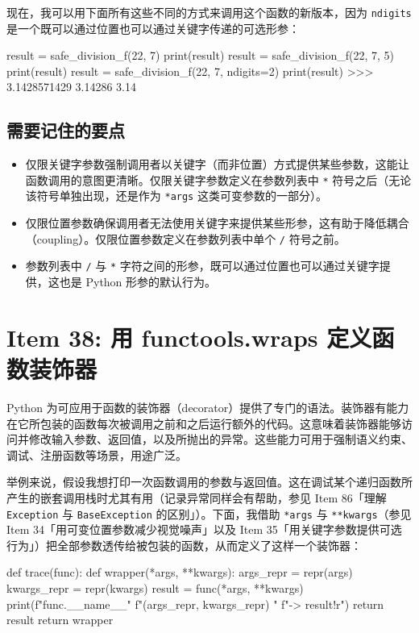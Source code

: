现在，我可以用下面所有这些不同的方式来调用这个函数的新版本，因为 \texttt{ndigits} 是一个既可以通过位置也可以通过关键字传递的可选形参：

\begin{codebox}[python]
result = safe_division_f(22, 7)
print(result)
result = safe_division_f(22, 7, 5)
print(result)
result = safe_division_f(22, 7, ndigits=2)
print(result)
>>>
3.1428571429
3.14286
3.14
\end{codebox}

\subsection{需要记住的要点}

\begin{itemize}
\item 仅限关键字参数强制调用者以关键字（而非位置）方式提供某些参数，这能让函数调用的意图更清晰。仅限关键字参数定义在参数列表中 \texttt{*} 符号之后（无论该符号单独出现，还是作为 \texttt{*args} 这类可变参数的一部分）。
\item 仅限位置参数确保调用者无法使用关键字来提供某些形参，这有助于降低耦合（coupling）。仅限位置参数定义在参数列表中单个 \texttt{/} 符号之前。
\item 参数列表中 \texttt{/} 与 \texttt{*} 字符之间的形参，既可以通过位置也可以通过关键字提供，这也是 Python 形参的默认行为。
\end{itemize}

\section{Item 38: 用 functools.wraps 定义函数装饰器}

Python 为可应用于函数的装饰器（decorator）提供了专门的语法。装饰器有能力在它所包装的函数每次被调用之前和之后运行额外的代码。这意味着装饰器能够访问并修改输入参数、返回值，以及所抛出的异常。这些能力可用于强制语义约束、调试、注册函数等场景，用途广泛。

举例来说，假设我想打印一次函数调用的参数与返回值。这在调试某个递归函数所产生的嵌套调用栈时尤其有用（记录异常同样会有帮助，参见 Item 86「理解 \texttt{Exception} 与 \texttt{BaseException} 的区别」）。下面，我借助 \texttt{*args} 与 \texttt{**kwargs}（参见 Item 34「用可变位置参数减少视觉噪声」以及 Item 35「用关键字参数提供可选行为」）把全部参数透传给被包装的函数，从而定义了这样一个装饰器：

\begin{codebox}[python]
def trace(func):
    def wrapper(*args, **kwargs):
        args_repr = repr(args)
        kwargs_repr = repr(kwargs)
        result = func(*args, **kwargs)
        print(f"{func.__name__}"
              f"({args_repr}, {kwargs_repr}) "
              f"-> {result!r}")
        return result
    return wrapper
\end{codebox}

